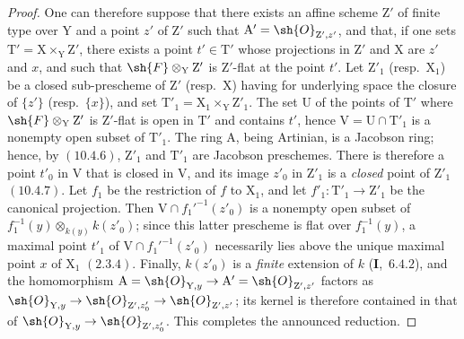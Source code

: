 \begin{proof}
One can therefore suppose that there exists an affine scheme $\mathrm{Z}'$ of finite type over $\mathrm{Y}$ and a
point $z'$ of $\mathrm{Z}'$ such that $\mathrm{A}'=\sh{O}_{\mathrm{Z}',z'}$, and that, if one sets $\mathrm{T}'=\mathrm{X}\times_\mathrm{Y}\mathrm{Z}'$, there exists a point
$t'\in\mathrm{T}'$ whose projections in $\mathrm{Z}'$ and $\mathrm{X}$ are $z'$ and $x$, and such that $\sh{F}\otimes_\mathrm{Y}\mathrm{Z}'$ is $\mathrm{Z}'$-flat at the
point $t'$. Let $\mathrm{Z}'_1$ (resp.\ $\mathrm{X}_1$) be a closed sub-prescheme of $\mathrm{Z}'$ (resp.\ $\mathrm{X}$) having for underlying space
the closure of $\{z'\}$ (resp.\ $\{x\}$), and set $\mathrm{T}'_1=\mathrm{X}_1\times_\mathrm{Y}\mathrm{Z}'_1$. The set $\mathrm{U}$ of the
points of $\mathrm{T}'$ where $\sh{F}\otimes_\mathrm{Y}\mathrm{Z}'$ is $\mathrm{Z}'$-flat is open in $\mathrm{T}'$  and contains $t'$, hence
$\mathrm{V}=\mathrm{U}\cap\mathrm{T}'_1$ is a nonempty open subset of $\mathrm{T}'_1$. The ring $\mathrm{A}$, being Artinian, is a Jacobson
ring; hence, by $(10.4.6)$, $\mathrm{Z}'_1$ and $\mathrm{T}'_1$ are Jacobson preschemes. There is therefore
a point $t'_0$ in $\mathrm{V}$ that is closed in $\mathrm{V}$, and its image $z'_0$ in $\mathrm{Z}'_1$ is a \emph{closed} point of $\mathrm{Z}'_1$ $(10.4.7)$.
Let $f_1$ be the restriction of $f$ to $\mathrm{X}_1$, and let $f'_1:\mathrm{T}'_1\to\mathrm{Z}'_1$ be the canonical projection. Then
$\mathrm{V}\cap f_1'^{-1}(z'_0)$ is a nonempty open subset of
$f_1^{-1}(y)\otimes_{k(y)}k(z'_0)$; since this latter prescheme is flat over $f_1^{-1}(y)$, a maximal point $t'_1$ of
$\mathrm{V}\cap f_1'^{-1}(z'_0)$ necessarily lies above the unique maximal point $x$ of $\mathrm{X}_1$ $(2.3.4)$.
Finally, $k(z'_0)$ is a \emph{finite} extension of $k$ (\textbf{I},~$6.4.2$), and the homomorphism
$\mathrm{A}=\sh{O}_{\mathrm{Y},y}\to\mathrm{A}'=\sh{O}_{\mathrm{Z}',z'}$ factors as
$\sh{O}_{\mathrm{Y},y}\to\sh{O}_{\mathrm{Z}',z'_0}\to\sh{O}_{\mathrm{Z}',z'}$; its kernel is therefore contained in that of
$\sh{O}_{\mathrm{Y},y}\to\sh{O}_{\mathrm{Z}',z'_0}$. This completes the announced reduction.


\end{proof}
